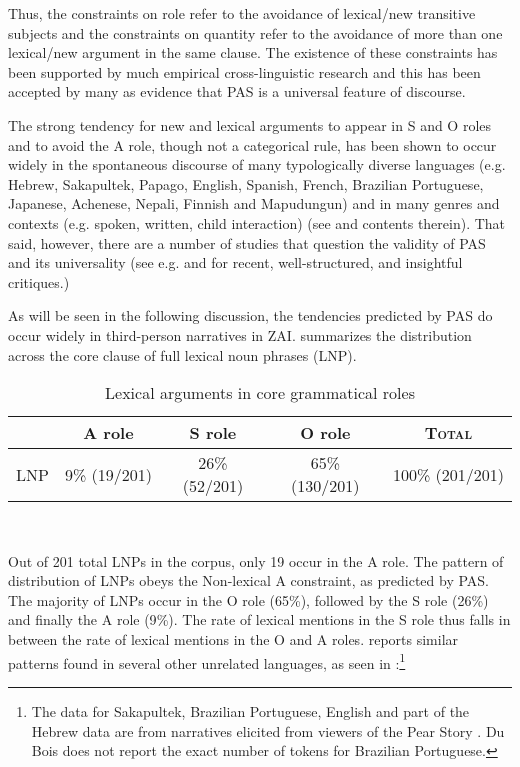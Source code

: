 Thus, the constraints on role refer to the avoidance of lexical/new transitive subjects and the constraints on quantity refer to the avoidance of more than one lexical/new argument in the same clause. The existence of these constraints has been supported by much empirical cross-linguistic research and this has been accepted by many as evidence that PAS is a universal feature of discourse.  

The strong tendency for new and lexical arguments to appear in S and O roles and to avoid the A role, though not a categorical rule, has been shown to occur widely in the spontaneous discourse of many typologically diverse languages (e.g. Hebrew, Sakapultek, Papago, English, Spanish, French, Brazilian Portuguese, Japanese, Achenese, Nepali, Finnish and Mapudungun) and in many genres and contexts (e.g. spoken, written, child interaction) (see \citealt{dubois2003} and contents therein). That said, however, there are a number of studies that question the validity of PAS and its universality (see e.g. \citealt{haig2016} and \citealt{schnell2017} for recent, well-structured, and insightful critiques.)

As will be seen in the following discussion, the tendencies predicted by PAS do occur widely in third-person narratives in ZAI.  summarizes the distribution across the core clause of full lexical noun phrases (LNP).


\begin{table}[htp] 
\begin{center}
\caption{\small{Lexical arguments in core grammatical roles}}
\begin{tabular}{| l | c | c | c | c |}\hline
 & A role & S role & O role & \textsc{Total} \\
\hline
 \textsc{LNP} & 9{\%} (19/201) & 26{\%}(52/201) & 65{\%} (130/201) & 100{\%} (201/201) \\
  \hline
\end{tabular}\\
\label{generaldist}
\end{center}
\end{table}

Out of 201 total LNPs in the corpus, only 19 occur in the A role. The pattern of distribution of LNPs obeys the Non-lexical A constraint, as predicted by PAS. The majority of LNPs occur in the O role (65{\%}), followed by the S role (26{\%}) and finally the A role (9{\%}).  The rate of lexical mentions in the S role thus falls in between the rate of lexical mentions in the O and A roles. \citet[37]{dubois2003b} reports similar patterns found in several other unrelated languages, as seen in :\footnote{The data for Sakapultek, Brazilian Portuguese, English and part of the Hebrew data are from narratives elicited from viewers of the Pear Story \citep[62-63]{dubois2003a}. Du Bois does not report the exact number of tokens for Brazilian Portuguese.}


